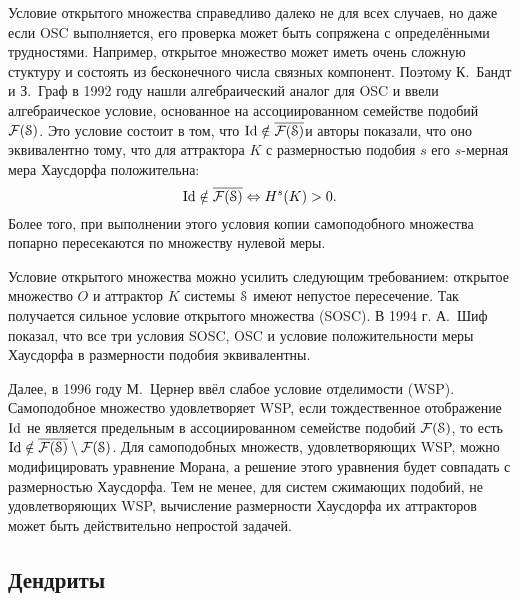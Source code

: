 Условие открытого множества справедливо далеко не для всех случаев, но даже если OSC выполняется, его проверка может быть сопряжена с определёнными трудностями.
Например, открытое множество может иметь очень сложную стуктуру и состоять из бесконечного числа связных компонент.
Поэтому К.~Бандт и З.~Граф в 1992 году \cite{SSS7} нашли алгебраический аналог для OSC и ввели алгебраическое условие, основанное на ассоциированном семействе подобий $\mathcal{F}({\EuScript S})$. 
Это условие состоит в том, что $\mathop{\rm Id} \nolimits\notin\overline{\mathcal{F}({\EuScript S})}$и авторы показали, что оно эквивалентно тому, что для аттрактора $K$ с размерностью подобия $s$ его $s$-мерная мера Хаусдорфа положительна:
$$\mathop{\rm Id} \nolimits\notin\overline{\mathcal{F}({\EuScript S})} \Leftrightarrow H^s(K)>0.$$
Более того, при выполнении этого условия копии самоподобного множества попарно пересекаются по множеству нулевой меры.

Условие открытого множества можно усилить следующим требованием: открытое множество $O$ и аттрактор $K$ системы ${\EuScript S}$ имеют непустое пересечение. 
Так получается сильное условие открытого множества (SOSC).
В 1994 г. А.~Шиф \cite{Schief1994} показал, что все три условия SOSC, OSC и условие положительности меры Хаусдорфа в размерности подобия эквивалентны.

Далее, в 1996 году М.~Цернер \cite{Zerner1996} ввёл слабое условие отделимости (WSP).
Самоподобное множество удовлетворяет WSP, если тождественное отображение $\mathop{\rm Id} \nolimits$ не является предельным в ассоциированном семействе подобий $\mathcal{F}({\EuScript S})$, то есть $\mathop{\rm Id} \nolimits\notin\overline{\mathcal{F}({\EuScript S})}\setminus\mathcal{F}({\EuScript S})$.
Для самоподобных множеств, удовлетворяющих WSP, можно модифицировать уравнение Морана, а решение этого уравнения будет совпадать с размерностью Хаусдорфа.
Тем не менее, для систем сжимающих подобий, не удовлетворяющих WSP, вычисление размерности Хаусдорфа их аттракторов может быть действительно непростой задачей.


\subsection{Дендриты}

